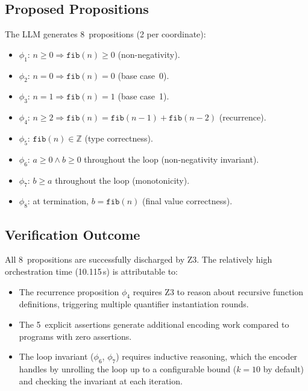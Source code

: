 \documentclass[11pt]{article}
\begin{document}
\subsection{Proposed Propositions}

The LLM generates 8~propositions (2 per coordinate):
\begin{itemize}[noitemsep]
  \item $\phi_1$: $n \ge 0 \Rightarrow \texttt{fib}(n) \ge 0$
        (non-negativity).
  \item $\phi_2$: $n = 0 \Rightarrow \texttt{fib}(n) = 0$
        (base case~0).
  \item $\phi_3$: $n = 1 \Rightarrow \texttt{fib}(n) = 1$
        (base case~1).
  \item $\phi_4$: $n \ge 2 \Rightarrow \texttt{fib}(n) =
        \texttt{fib}(n-1) + \texttt{fib}(n-2)$ (recurrence).
  \item $\phi_5$: $\texttt{fib}(n) \in \mathbb{Z}$ (type correctness).
  \item $\phi_6$: $a \ge 0 \wedge b \ge 0$ throughout the loop
        (non-negativity invariant).
  \item $\phi_7$: $b \ge a$ throughout the loop (monotonicity).
  \item $\phi_8$: at termination, $b = \texttt{fib}(n)$ (final value
        correctness).
\end{itemize}

\subsection{Verification Outcome}

All 8~propositions are successfully discharged by Z3.  The relatively
high orchestration time (10.115\,s) is attributable to:
\begin{itemize}[noitemsep]
  \item The recurrence proposition $\phi_4$ requires Z3 to reason about
        recursive function definitions, triggering multiple quantifier
        instantiation rounds.
  \item The 5~explicit assertions generate additional encoding work
        compared to programs with zero assertions.
  \item The loop invariant ($\phi_6$, $\phi_7$) requires inductive
        reasoning, which the encoder handles by unrolling the loop up to
        a configurable bound ($k = 10$ by default) and checking the
        invariant at each iteration.
\end{itemize}
\end{document}
